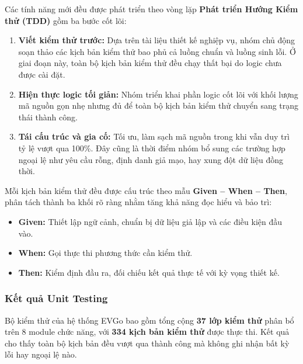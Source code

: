 \hspace*{\parindent}
Các tính năng mới đều được phát triển theo vòng lặp
\textbf{Phát triển Hướng Kiểm thử (TDD)} gồm ba bước cốt lõi:

\begin{enumerate}
    \item \textbf{Viết kiểm thử trước:} Dựa trên tài liệu thiết kế nghiệp vụ, nhóm chủ động soạn thảo các kịch bản kiểm thử bao phủ cả luồng chuẩn và luồng sinh lỗi. Ở giai đoạn này, toàn bộ kịch bản kiểm thử đều chạy thất bại do logic chưa được cài đặt.

    \item \textbf{Hiện thực logic tối giản:} Nhóm triển khai phần logic cốt lõi với khối lượng mã nguồn gọn nhẹ nhưng đủ để toàn bộ kịch bản kiểm thử chuyển sang trạng thái thành công.

    \item \textbf{Tái cấu trúc và gia cố:} Tối ưu, làm sạch mã nguồn trong khi vẫn duy trì tỷ lệ vượt qua 100\%. Đây cũng là thời điểm nhóm bổ sung các trường hợp ngoại lệ như yêu cầu rỗng, định danh giả mạo, hay xung đột dữ liệu đồng thời.
\end{enumerate}

Mỗi kịch bản kiểm thử đều được cấu trúc theo mẫu \textbf{Given -- When -- Then},
phân tách thành ba khối rõ ràng nhằm tăng khả năng đọc hiểu và bảo trì:

\begin{itemize}
    \item \textbf{Given:} Thiết lập ngữ cảnh, chuẩn bị dữ liệu giả lập và các điều kiện đầu vào.
    \item \textbf{When:} Gọi thực thi phương thức cần kiểm thử.
    \item \textbf{Then:} Kiểm định đầu ra, đối chiếu kết quả thực tế với kỳ vọng thiết kế.
\end{itemize}

\subsubsection{Kết quả Unit Testing}

\hspace*{\parindent}
Bộ kiểm thử của hệ thống EVGo bao gồm tổng cộng \textbf{37 lớp kiểm thử}
phân bổ trên 8 module chức năng, với \textbf{334 kịch bản kiểm thử} được thực thi.
Kết quả cho thấy toàn bộ kịch bản đều vượt qua thành công mà không ghi nhận bất kỳ
lỗi hay ngoại lệ nào.

